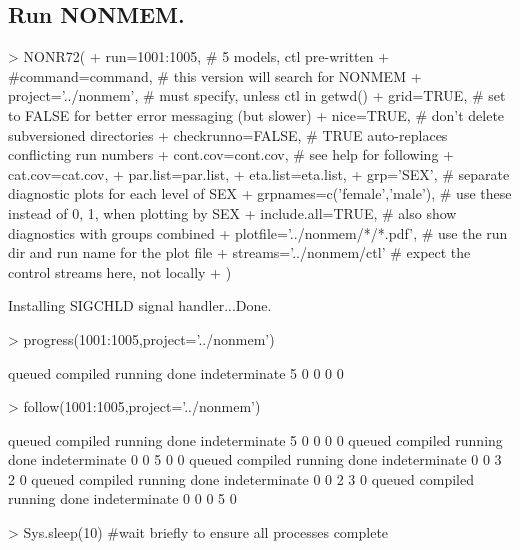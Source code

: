 \subsection{Run NONMEM.}
\begin{Schunk}
\begin{Sinput}
> NONR72(
+      run=1001:1005,                       # 5 models, ctl pre-written
+      #command=command,                    # this version will search for NONMEM
+      project='../nonmem',                 # must specify, unless ctl in getwd()
+      grid=TRUE,                          # set to FALSE for better error messaging (but slower)
+      nice=TRUE,                           # don't delete subversioned directories
+      checkrunno=FALSE,                    # TRUE auto-replaces conflicting run numbers
+      cont.cov=cont.cov,                   # see help for following
+      cat.cov=cat.cov,
+      par.list=par.list,
+      eta.list=eta.list,
+      grp='SEX',                           # separate diagnostic plots for each level of SEX
+      grpnames=c('female','male'),         # use these instead of 0, 1, when plotting by SEX
+      include.all=TRUE,                    # also show diagnostics with groups combined
+      plotfile='../nonmem/*/*.pdf',        # use the run dir and run name for the plot file 
+      streams='../nonmem/ctl'              # expect the control streams here, not locally
+ )
\end{Sinput}
\begin{Soutput}
Installing SIGCHLD signal handler...Done.
\end{Soutput}
\begin{Sinput}
> progress(1001:1005,project='../nonmem')
\end{Sinput}
\begin{Soutput}
       queued      compiled       running          done indeterminate 
            5             0             0             0             0 
\end{Soutput}
\begin{Sinput}
> follow(1001:1005,project='../nonmem')
\end{Sinput}
\begin{Soutput}
       queued      compiled       running          done indeterminate 
            5             0             0             0             0 
       queued      compiled       running          done indeterminate 
            0             0             5             0             0 
       queued      compiled       running          done indeterminate 
            0             0             3             2             0 
       queued      compiled       running          done indeterminate 
            0             0             2             3             0 
       queued      compiled       running          done indeterminate 
            0             0             0             5             0 
\end{Soutput}
\begin{Sinput}
> Sys.sleep(10)                             #wait briefly to ensure all processes complete
\end{Sinput}
\end{Schunk}
